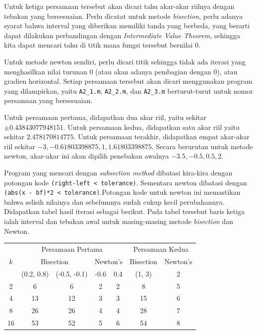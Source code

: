 \documentclass[11pt, a4paper, onecolumn, oneside, final]{report}
\begin{document}
Untuk ketiga persamaan tersebut akan dicari tahu akar-akar riilnya dengan tebakan yang bersesuaian. Perlu dicatat untuk metode \textit{bisection}, perlu adanya syarat bahwa interval yang diberikan memiliki tanda yang berbeda, yang berarti dapat dilakukan perbandingan dengan \textit{Intermediate Value Theorem}, sehingga kita dapat mencari tahu di titik mana fungsi tersebut bernilai 0.

Untuk metode newton sendiri, perlu dicari titik sehingga tidak ada iterasi yang menghasilkan nilai turunan $0$ (atau akan adanya pembagian dengan $0$), atau gradien horizontal. Setiap persamaan tersebut akan dicari menggunakan program yang dilampirkan, yaitu \texttt{A2\_1.m}, \texttt{A2\_2.m}, dan \texttt{A2\_3.m} berturut-turut untuk nomor persamaan yang bersesuaian.

Untuk persamaan pertama, didapatkan dua akar riil, yaitu sekitar $\pm 0.43843077948151$. Untuk persamaan kedua, didapatkan satu akar riil yaitu sekitar $2.478170814775$. Untuk persamaan terakhir, didapatkan empat akar-akar riil sekitar $-3, -0.61803398875, 1, 1.61803398875$. Secara berurutan untuk metode newton, akar-akar ini akan dipilih penebakan awalnya $-3.5, -0.5, 0.5, 2$.

Program yang mencari dengan \textit{subsection method} dibatasi kira-kira dengan potongan kode \texttt{(right-left < tolerance)}. Sementara newton dibatasi dengan \texttt{(abs(x - bf)*2 < tolerance)}.Potongan kode untuk newton ini memastikan bahwa selisih nilainya dan sebelumnya sudah cukup kecil perubahannya. Didapatkan tabel hasil iterasi sebagai berikut. Pada tabel tersebut baris ketiga ialah interval dan tebakan awal untuk masing-masing metode \textit{bisection} dan Newton.

\begin{table}[H]
\centering
\begin{tabular}{|c|c|c|c|c|c|c|}
\hline
\multirow{3}{*}{$k$} & \multicolumn{4}{c|}{Persamaan Pertama} & \multicolumn{2}{c|}{Persamaan Kedua} \\ \cline{2-7} 
& \multicolumn{2}{c|}{Bisection} & \multicolumn{2}{c|}{Newton's } & Bisection & Newton's \\ \cline{2-7} 
& (0.2, 0.8) & (-0.5, -0.1) & -0.6 & 0.4 & (1, 3) & 2 \\ \hline
2 & 6 & 6 & 2 & 2 & 8 & 5 \\ \hline
4 & 13 & 12 & 3 & 3 & 15 & 6 \\ \hline
8 & 26 & 26 & 4 & 4 & 28 & 7 \\ \hline
16 & 53 & 52 & 5 & 6 & 54 & 8 \\ \hline
\end{tabular}
\end{table}
\end{document}
